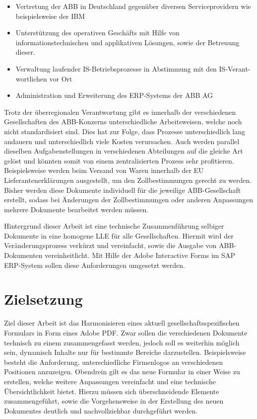 \begin{itemize}
	\item Vertretung der \ac{ABB} in Deutschland gegenüber diversen Serviceprovidern wie beispielsweise der IBM
	\item Unterstützung des operativen Geschäfts mit Hilfe von informationstechnischen und applikativen  Lösungen, sowie der Betreuung dieser.
	\item Verwaltung laufender IS-Betriebsprozesse in Abstimmung mit den IS-Verant-wortlichen vor Ort
	\item Administration und Erweiterung des \ac{ERP}-Systems der \ac{ABB} AG
\end{itemize}


 Trotz der überregionalen Verantwortung gibt es innerhalb der verschiedenen Gesellschaften des \ac{ABB}-Konzerns unterschiedliche Arbeitsweisen, welche noch nicht standardisiert sind. Dies hat zur Folge, dass Prozesse unterschiedlich lang andauern und unterschiedlich viele Kosten verursachen. Auch werden parallel dieselben Aufgabenstellungen in verschiedenen Abteilungen auf die gleiche Art gelöst und könnten somit von einem zentralisierten Prozess sehr profitieren. Beispielsweise werden beim Versand von Waren innerhalb der \ac{EU} Lieferantenerklärungen ausgestellt, um den Zollbestimmungen gerecht zu werden. Bisher werden diese Dokumente individuell für die jeweilige ABB-Gesellschaft erstellt, sodass bei Änderungen der Zollbestimmungen oder anderen Anpassungen mehrere Dokumente bearbeitet werden müssen.
 
 Hintergrund dieser Arbeit ist eine technische Zusammenführung selbiger Dokumente in eine homogene \acf{LLE} für alle Gesellschaften. Hiermit wird der Veränderungsprozess verkürzt und vereinfacht, sowie die Ausgabe von \ac{ABB}-Dokumenten vereinheitlicht. Mit Hilfe der Adobe Interactive Forms im SAP ERP-System sollen diese Anforderungen umgesetzt werden.

\section{Zielsetzung}

Ziel dieser Arbeit ist das Harmonisieren eines aktuell gesellschaftsspezifischen Formulars in Form eines Adobe \ac{PDF}. Zwar sollen die verschiedenen Dokumente technisch zu einem zusammengefasst werden, jedoch soll es weiterhin möglich sein, dynamisch Inhalte nur für bestimmte Bereiche darzustellen. Beispielsweise besteht die Anforderung, unterschiedliche Firmenlogos an verschiedenen Positionen anzuzeigen. Obendrein gilt es das neue Formular in einer Weise zu erstellen, welche weitere Anpassungen vereinfacht und eine technische Übersichtlichkeit bietet.
Hierzu müssen sich überschneidende Elemente zusammengeführt, sowie die Vorgehensweise in der Erstellung des neuen Dokumentes deutlich und nachvollziehbar durchgeführt werden.


